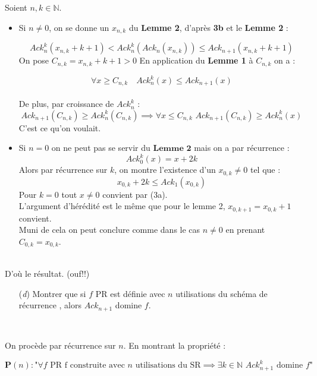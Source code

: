 \documentclass[12pt,letterpaper,boxed]{hmcpset}
\newcommand{\property}{\mathbf{P}}
\begin{document}
\begin{solution}
\begin{solution}[(c)]
\noindent Soient $n,k \in \mathbb{N}$. \\
\begin{itemize}
\item
Si $n \neq 0$, on se donne un $x_{n,k}$ du \textbf{Lemme 2}, d'après \textbf{3b} et le \textbf{Lemme 2}  : 

$$  Ack^{k}_{n}(x_{n,k}+k+1) < Ack^{k}_{n}(Ack_{n}(x_{n,k})) \leq Ack_{n+1}(x_{n,k}+k+1)$$
On pose $C_{n,k} = x_{n,k} + k + 1 > 0$
En application du \textbf{Lemme 1} à $C_{n,k}$ on a : 

$$ \forall x \geq C_{n,k} \quad Ack^{k}_{n}(x) \leq Ack_{n+1}(x)$$
\ \\
De plus, par croissance de $Ack^{k}_{n}$ :  $$Ack_{n+1}(C_{n,k}) \geq Ack^{k}_{n}(C_{n,k}) \implies \forall x \leq C_{n,k} 
\, \, Ack_{n+1}(C_{n,k}) \geq Ack^{k}_{n}(x)
$$
C'est ce qu'on voulait. \\
\item Si $n = 0$ on ne peut pas se servir du $\textbf{Lemme 2}$ mais on a par récurrence : 
$$ Ack^{k}_{0}(x) = x+2k$$
\noindent Alors par récurrence sur $k$, on montre l'existence d'un $x_{0,k} \neq 0$ tel que :
$$x_{0,k} + 2k \leq Ack_{1}(x_{0,k})$$
Pour $k=0$ tout $x \neq 0$ convient par (3a). \\
L'argument d'hérédité est le même que pour le lemme 2, $x_{0,k+1}=x_{0,k}+1$ convient. \\
Muni de cela on peut conclure comme dans le cas $n \neq 0$ en prenant $C_{0,k}=x_{0,k}$. 
\end{itemize}
\ \\
D'où le résultat. (ouf!!)
\end{solution}

\begin{problem}
\begin{itemize}  
  \item[(\textit{d})]  Montrer que si $f$ PR est définie avec $n$ utilisations du 
  schéma de récurrence , alors $Ack_{n+1}$ domine $f$.
 \end{itemize}
 \end{problem}
 
 \ \\
 \begin{solution}[(d)]
\noindent On procède par récurrence sur $n$. En montrant la propriété : 

$$ 
\property(n) : \text{"} \forall f \text{  PR  } \text{f construite avec } n \text{ utilisations du SR} \implies
\exists k \in \mathbb{N} \, \, Ack^{k}_{n+1} \text{ domine } f \text{"}
$$
\newpage


\end{solution}
\end{solution}
\end{document}
